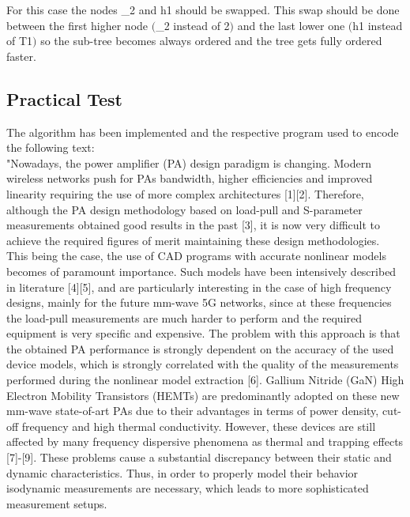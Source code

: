 \begin{refsection}
For this case the nodes \_2 and h1 should be swapped. This swap should be done between the first higher node $($\_2 instead of 2$)$ and the last lower one $($h1 instead of T1$)$ so the sub-tree becomes always ordered and the tree gets fully ordered faster.

\subsection{Practical Test}

\hspace{5mm} The algorithm has been implemented and the respective program used to encode the following text:\\
{\tiny "Nowadays, the power amplifier (PA) design paradigm is changing. Modern wireless networks push for PAs bandwidth, higher efficiencies and improved linearity requiring the use of more complex architectures [1][2]. Therefore, although the PA design methodology based on load-pull and S-parameter measurements obtained good results in the past [3], it is now very difficult to achieve the required figures of merit maintaining these design methodologies. This being the case, the use of CAD programs with accurate nonlinear models becomes of paramount importance. Such models have been intensively described in literature [4][5], and are particularly interesting in the case of high frequency designs, mainly for the future mm-wave 5G networks, since at these frequencies the load-pull measurements are much harder to perform and the required equipment is very specific and expensive. The problem with this approach is that the obtained PA performance is strongly dependent on the accuracy of the used device models, which is strongly correlated with the quality of the measurements performed during the nonlinear model extraction [6].
Gallium Nitride (GaN) High Electron Mobility Transistors (HEMTs) are predominantly adopted on these new mm-wave state-of-art PAs due to their advantages in terms of power density, cut-off frequency and high thermal conductivity. However, these devices are still affected by many frequency dispersive phenomena as thermal and trapping effects [7]-[9]. These problems cause a substantial discrepancy between their static and dynamic characteristics. Thus, in order to properly model their behavior isodynamic measurements are necessary, which leads to more sophisticated measurement setups.
}
\end{refsection}

